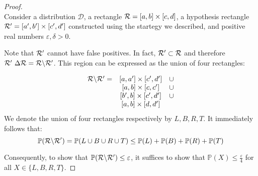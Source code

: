    \begin{proof}
        \ \\
        Consider a distribution \(\mathcal{D}\), a rectangle \(\mathcal{R} = [a, b]\times[c, d]\), a hypothesis rectangle \(\mathcal{R}^\prime = [a^\prime, b^\prime] \times [c^\prime, d^\prime]\) constructed using the startegy we described, and positive real numbers \(\varepsilon, \delta>0\).

        Note that \(\mathcal{R}^\prime\) cannot have false positives. In fact, \(\mathcal{R}^\prime\subset\mathcal{R}\) and therefore \(\mathcal{R}^\prime~\Delta\mathcal{R} = \mathcal{R}\backslash\mathcal{R}^\prime\). 
        This region can be expressed as the union of four rectangles: 

        \[
            \begin{array}{ccc}
                \mathcal{R}\backslash\mathcal{R}^\prime = & [a, a^\prime] \times [c^\prime, d^\prime]& \cup\\
                    & [a, b] \times [c, c^\prime] & \cup\\
                    & [b^\prime, b] \times [c^\prime, d^\prime] & \cup\\
                    & [a, b] \times [d, d^\prime]
            \end{array}
        \]
        We denote the union of four rectangles respectively by \(L, B, R, T\). It immediately follows that:
        \[
            \mathbb{P}(\mathcal{R}\backslash\mathcal{R}^\prime) = \mathbb{P}(L \cup B \cup R \cup T) \le \mathbb{P}(L) + \mathbb{P}(B) + \mathbb{P}(R) + \mathbb{P}(T)    
        \]
        
        Consequently, to show that \(\mathbb{P}(\mathcal{R}\backslash\mathcal{R}^\prime) \le \varepsilon\), it suffices to show that \(\mathbb{P}(X) \le \frac{\varepsilon}{4}\) for all \(X\in\{L, B, R, T\}\).

    \end{proof}